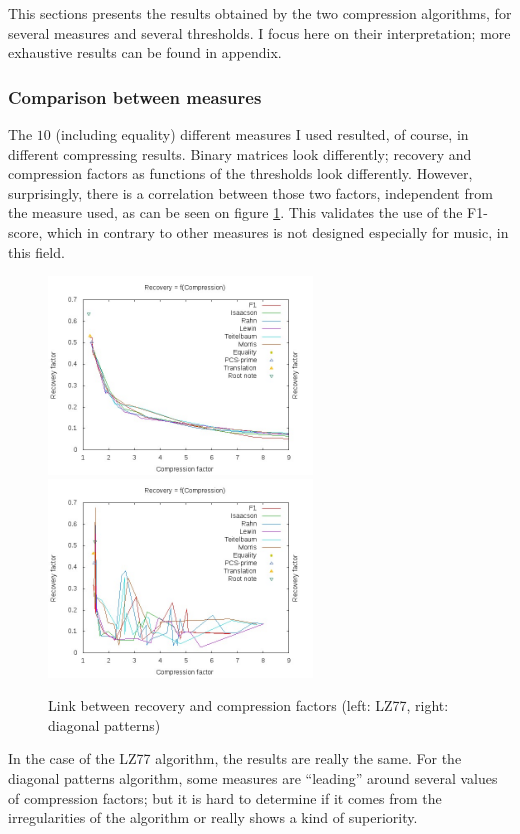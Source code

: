 \documentclass[a4paper,10pt]{article}
\newcommand{\guill}[1]{``#1''}
\begin{document}
This sections presents the results obtained by the two compression algorithms, for several measures and several thresholds. I focus here on their interpretation; more exhaustive results can be found in appendix.

\subsubsection*{Comparison between measures}

The $10$ (including equality) different measures I used resulted, of course, in different compressing results. Binary matrices look differently; recovery and compression factors as functions of the thresholds look differently. However, surprisingly, there is a correlation between those two factors, independent from the measure used, as can be seen on figure \ref{rfc}. This validates the use of the F1-score, which in contrary to other measures is not designed especially for music, in this field.

\begin{figure}[h]
\centering
\includegraphics[width=7cm]{images/RfC77.jpg}\hspace{0.5cm}
\includegraphics[width=7cm]{images/RfCDiag.jpg}
\caption{Link between recovery and compression factors (left: LZ77, right: diagonal patterns)\label{rfc}}
\end{figure}

In the case of the LZ77 algorithm, the results are really the same. For the diagonal patterns algorithm, some measures are \guill{leading} around several values of compression factors; but it is hard to determine if it comes from the irregularities of the algorithm or really shows a kind of superiority.
\end{document}
